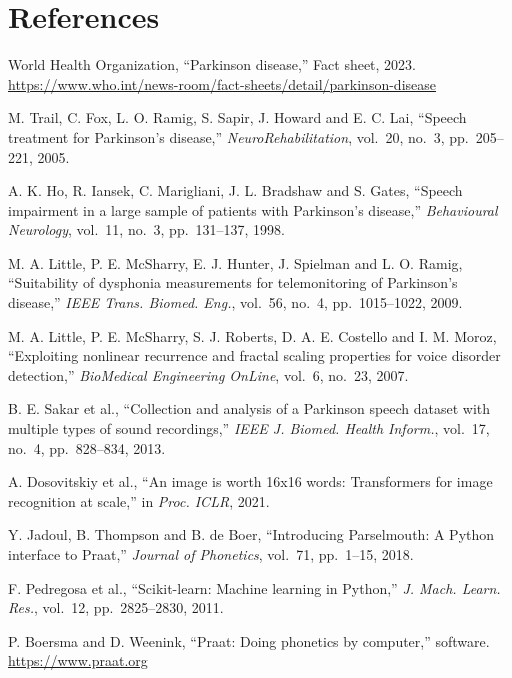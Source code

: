 \section*{References}
{\footnotesize\raggedright
\begin{enumerate}[label={[\arabic*]},leftmargin=2.2em,itemsep=1pt]
\item World Health Organization, ``Parkinson disease,'' Fact sheet, 2023. \url{https://www.who.int/news-room/fact-sheets/detail/parkinson-disease}
\item M. Trail, C. Fox, L. O. Ramig, S. Sapir, J. Howard and E. C. Lai, ``Speech treatment for Parkinson's disease,'' \textit{NeuroRehabilitation}, vol.~20, no.~3, pp.~205--221, 2005.
\item A. K. Ho, R. Iansek, C. Marigliani, J. L. Bradshaw and S. Gates, ``Speech impairment in a large sample of patients with Parkinson's disease,'' \textit{Behavioural Neurology}, vol.~11, no.~3, pp.~131--137, 1998.
\item M. A. Little, P. E. McSharry, E. J. Hunter, J. Spielman and L. O. Ramig, ``Suitability of dysphonia measurements for telemonitoring of Parkinson's disease,'' \textit{IEEE Trans. Biomed. Eng.}, vol.~56, no.~4, pp.~1015--1022, 2009.
\item M. A. Little, P. E. McSharry, S. J. Roberts, D. A. E. Costello and I. M. Moroz, ``Exploiting nonlinear recurrence and fractal scaling properties for voice disorder detection,'' \textit{BioMedical Engineering OnLine}, vol.~6, no.~23, 2007.
\item B. E. Sakar et al., ``Collection and analysis of a Parkinson speech dataset with multiple types of sound recordings,'' \textit{IEEE J. Biomed. Health Inform.}, vol.~17, no.~4, pp.~828--834, 2013.
\item A. Dosovitskiy et al., ``An image is worth 16x16 words: Transformers for image recognition at scale,'' in \textit{Proc. ICLR}, 2021.
\item Y. Jadoul, B. Thompson and B. de Boer, ``Introducing Parselmouth: A Python interface to Praat,'' \textit{Journal of Phonetics}, vol.~71, pp.~1--15, 2018.
\item F. Pedregosa et al., ``Scikit-learn: Machine learning in Python,'' \textit{J. Mach. Learn. Res.}, vol.~12, pp.~2825--2830, 2011.
\item P. Boersma and D. Weenink, ``Praat: Doing phonetics by computer,'' software. \url{https://www.praat.org}
\end{enumerate}}
